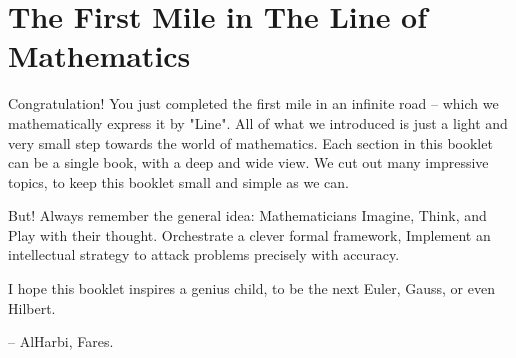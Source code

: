
\section{The First Mile in The Line of Mathematics}
Congratulation! You just completed the first mile in an infinite road -- which we mathematically express it by "Line".
All of what we introduced is just a light and very small step towards the world of mathematics. 
Each section in this booklet can be a single book, with a deep and wide view. We cut out many impressive topics, to keep this booklet small and simple as we can.

But! Always remember the general idea: Mathematicians Imagine, Think, and Play with their thought. Orchestrate a clever formal framework, Implement an intellectual strategy to attack problems precisely with accuracy. 

\vspace{30pt}
I hope this booklet inspires a genius child, to be the next Euler, Gauss, or even Hilbert.

\vspace{10pt}
-- AlHarbi, Fares.